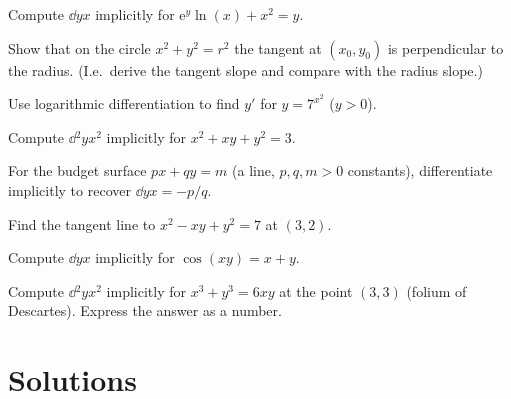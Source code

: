 \begin{problems}
  \item Compute $\dd{y}{x}$ implicitly for $\mathrm{e}^{y}\ln(x)+x^{2}=y$.
  \item Show that on the circle $x^{2}+y^{2}=r^{2}$ the tangent at
        $(x_{0},y_{0})$ is perpendicular to the radius. (I.e.\ derive the
        tangent slope and compare with the radius slope.)
  \item Use logarithmic differentiation to find $y'$ for $y=7^{x^{2}}$
        ($y>0$).
  \item Compute $\dd{^{2}y}{x^{2}}$ implicitly for $x^{2}+xy+y^{2}=3$.
  \item For the budget surface $px+qy=m$ (a line, $p,q,m>0$ constants),
        differentiate implicitly to recover $\dd{y}{x}=-p/q$.
  \item Find the tangent line to $x^{2}-xy+y^{2}=7$ at $(3,2)$.
  \item Compute $\dd{y}{x}$ implicitly for $\cos(xy)=x+y$.
  \item Compute $\dd{^{2}y}{x^{2}}$ implicitly for $x^{3}+y^{3}=6xy$ at the
        point $(3,3)$ (folium of Descartes). Express the answer as a
        number.
\end{problems}

\section{Solutions}

